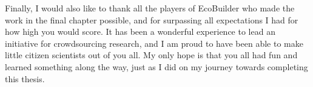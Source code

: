 \begin{acknowledgements}
Finally, I would also like to thank all the players of EcoBuilder who made the work in the final chapter possible, and for surpassing all expectations I had for how high you would score. It has been a wonderful experience to lead an initiative for crowdsourcing research, and I am proud to have been able to make little citizen scientists out of you all.
My only hope is that you all had fun and learned something along the way, just as I did on my journey towards completing this thesis.

\end{acknowledgements}